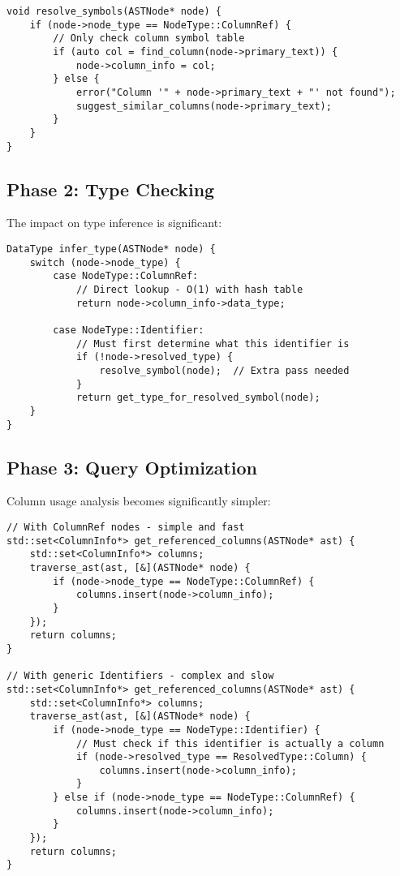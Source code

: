 \documentclass[11pt,a4paper]{article}
\begin{document}
\begin{lstlisting}[style=cpp]
void resolve_symbols(ASTNode* node) {
    if (node->node_type == NodeType::ColumnRef) {
        // Only check column symbol table
        if (auto col = find_column(node->primary_text)) {
            node->column_info = col;
        } else {
            error("Column '" + node->primary_text + "' not found");
            suggest_similar_columns(node->primary_text);
        }
    }
}
\end{lstlisting}

\subsection{Phase 2: Type Checking}

The impact on type inference is significant:

\begin{lstlisting}[style=cpp]
DataType infer_type(ASTNode* node) {
    switch (node->node_type) {
        case NodeType::ColumnRef:
            // Direct lookup - O(1) with hash table
            return node->column_info->data_type;
            
        case NodeType::Identifier:
            // Must first determine what this identifier is
            if (!node->resolved_type) {
                resolve_symbol(node);  // Extra pass needed
            }
            return get_type_for_resolved_symbol(node);
    }
}
\end{lstlisting}

\subsection{Phase 3: Query Optimization}

Column usage analysis becomes significantly simpler:

\begin{lstlisting}[style=cpp]
// With ColumnRef nodes - simple and fast
std::set<ColumnInfo*> get_referenced_columns(ASTNode* ast) {
    std::set<ColumnInfo*> columns;
    traverse_ast(ast, [&](ASTNode* node) {
        if (node->node_type == NodeType::ColumnRef) {
            columns.insert(node->column_info);
        }
    });
    return columns;
}

// With generic Identifiers - complex and slow
std::set<ColumnInfo*> get_referenced_columns(ASTNode* ast) {
    std::set<ColumnInfo*> columns;
    traverse_ast(ast, [&](ASTNode* node) {
        if (node->node_type == NodeType::Identifier) {
            // Must check if this identifier is actually a column
            if (node->resolved_type == ResolvedType::Column) {
                columns.insert(node->column_info);
            }
        } else if (node->node_type == NodeType::ColumnRef) {
            columns.insert(node->column_info);
        }
    });
    return columns;
}
\end{lstlisting}
\end{document}
